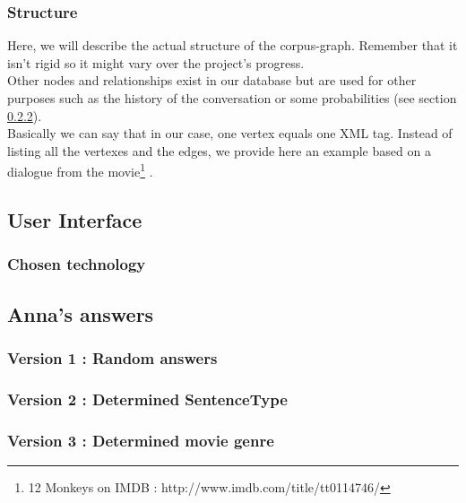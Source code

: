 \subsubsection{Structure}
Here, we will describe the actual structure of the corpus-graph. Remember that it isn't rigid so it might vary over the project's progress.\\
Other nodes and relationships exist in our database but are used for other purposes such as the history of the conversation or some probabilities (see section \ref{sssec:v_stype}).\\
Basically we can say that in our case, one vertex equals one XML tag. Instead of listing all the vertexes and the edges, we provide here an example based on a dialogue from the movie\footnote{12 Monkeys on IMDB : http://www.imdb.com/title/tt0114746/} .


% 
\subsection{User Interface}
\subsubsection{Chosen technology}
% 
\subsection{Anna's answers}
\subsubsection{Version 1 : Random answers}
\label{sssec:v_rand}

\subsubsection{Version 2 : Determined SentenceType}
\label{sssec:v_stype}

\subsubsection{Version 3 : Determined movie genre}
\label{sssec:v_genre}